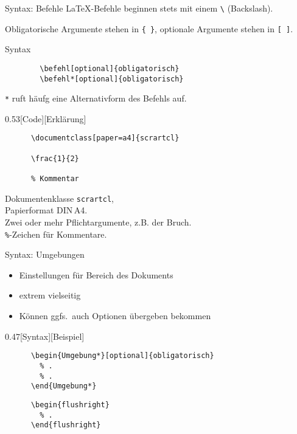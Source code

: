 \begin{frame}[fragile]{Syntax: Befehle}
  \LaTeX-Befehle beginnen stets mit einem \verb+\+ (Backslash).

  Obligatorische Argumente stehen in \lstinline+{ }+, optionale Argumente stehen in \lstinline+[ ]+.
    \begin{block}{Syntax}
      \begin{lstlisting}
        \befehl[optional]{obligatorisch}
        \befehl*[optional]{obligatorisch}
      \end{lstlisting}
    \end{block}

  \verb+*+ ruft häufg eine Alternativform des Befehls auf.
  \begin{CodeExplanation}{0.53}[Code][Erklärung]
    \begin{lstlisting}
      \documentclass[paper=a4]{scrartcl}

      \frac{1}{2}

      % Kommentar
    \end{lstlisting}
  \Explanation
    Dokumentenklasse \texttt{scrartcl},\\
    Papierformat DIN\,A4. \\
    Zwei oder mehr Pflichtargumente, z.B. der Bruch. \\
    \verb+%+-Zeichen für Kommentare.
  \end{CodeExplanation}
\end{frame}

\begin{frame}[fragile]{Syntax: Umgebungen}
  \begin{itemize}
    \item Einstellungen für Bereich des Dokuments
    \item extrem vielseitig
    \item Können ggfs.\ auch Optionen übergeben bekommen
  \end{itemize}
  \begin{CodeExplanation}{0.47}[Syntax][Beispiel]
    \begin{lstlisting}
      \begin{Umgebung*}[optional]{obligatorisch}
        % .
        % .
      \end{Umgebung*}
    \end{lstlisting}
    \Explanation
    \begin{lstlisting}
      \begin{flushright}
        % .
      \end{flushright}
    \end{lstlisting}
  \end{CodeExplanation}
\end{frame}

